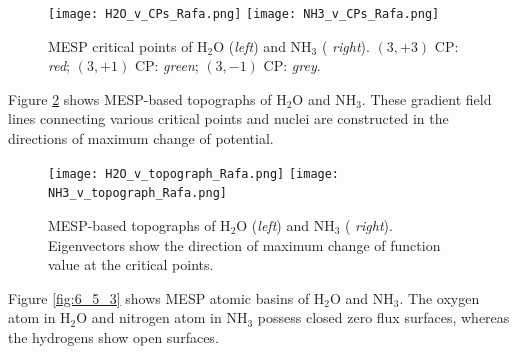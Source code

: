 \documentclass[10pt]{article}
\begin{document}
\vspace*{1cm}
\begin{figure}[H]
\begin{center}
\vspace*{-3mm}
\texttt{[image: H2O\_v\_CPs\_Rafa.png]}
\hspace*{5mm}
\texttt{[image: NH3\_v\_CPs\_Rafa.png]}
\end{center}
\caption[MESP critical points of H$_2$O and NH$_3$]{MESP critical points of H$_2$O ({\it left}) and NH$_3$ ({\it
right}). $(3,+3)$ CP: {\it red}; $(3,+1)$ CP: {\it green}; $(3,-1)$ CP: {\it grey}.
\label{fig:6_5_1}}
\end{figure}

Figure \ref{fig:6_5_2} shows MESP-based topographs of H$_2$O and NH$_3$. These gradient field lines connecting various critical points and
nuclei are constructed in the directions of maximum change of potential.

\begin{figure}[H]
\begin{center}
\vspace*{-3mm}
\texttt{[image: H2O\_v\_topograph\_Rafa.png]}
\hspace*{5mm}
\texttt{[image: NH3\_v\_topograph\_Rafa.png]}
\end{center}
\caption[MESP topographs of H$_2$O and NH$_3$]{MESP-based topographs of H$_2$O ({\it left}) and NH$_3$ ({\it
right}). Eigenvectors show the direction of maximum change of function value at the critical points.
\label{fig:6_5_2}}
\end{figure}

Figure \ref{fig:6_5_3} shows MESP atomic basins of H$_2$O and NH$_3$. The oxygen atom in H$_2$O and nitrogen atom in NH$_3$ 
possess closed zero flux surfaces, whereas the hydrogens show open surfaces. 
  
\end{document}
